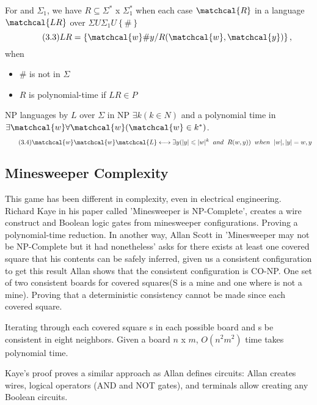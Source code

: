 \documentclass[a4paper]{article}
\numberwithin{equation}{subsection}
\begin{document}
For \Sigman and $\Sigma_1$, we have $R \subseteq \Sigma^*$ x $\Sigma^*_1$ when each case $\matchcal{R}$ in a language $\matchcal{LR}$ over $\Sigma U \Sigma_1 U \left \{\#\right \}$
\begin{equation} \tag{3.3}
LR = \left \{ \matchcal{w} \# y / R(\matchcal{w},\matchcal{y})\right\},
\end{equation}
when 
\begin{itemize}
  \item \# is not in $\Sigma$
  \item $R$ is polynomial-time if $LR \in P$
\end{itemize}
NP languages by $L$ over $\Sigma$ in NP $\exists k(k \in N)$ and a polynomial time in  $ \exists\matchcal{w}\forall\matchcal{w}(\matchcal{w} \in k^* )$.
\begin{equation} \tag{3.4}
\matchcal{w}\matchcal{w}\matchcal{L} \longleftrightarrow \exists y (\lvert  y \rvert \leqslant \lvert w \rvert^k \hspace{2mm}and \hspace{2mm} R(w,y)) \hspace{2mm} when \hspace{2mm} \lvert w \rvert, \lvert y \rvert = w,y
\end{equation}


\subsection{Minesweeper Complexity}

This game has been different in complexity, even in electrical engineering. Richard Kaye in his paper called 'Minesweeper is NP-Complete', creates a wire construct and Boolean logic gates from minesweeper configurations. Proving a polynomial-time reduction. In another way, Allan Scott in 'Minesweeper may not be NP-Complete but it had nonetheless' asks for there exists at least one covered square that his contents can be safely inferred, given us a consistent configuration to get this result Allan shows that the consistent configuration is CO-NP. One set of two consistent boards for covered squares(S is a mine and one where is not a mine). Proving that a deterministic consistency cannot be made since each covered square.


Iterating through each covered square s in each possible board and s be consistent in eight neighbors. Given a board $n$ x $m$, $O(n^2m^2)$ time takes polynomial time.


Kaye's proof proves a similar approach as Allan defines circuits: Allan creates wires, logical operators (AND and NOT gates), and terminals allow creating any Boolean circuits.
\end{document}
